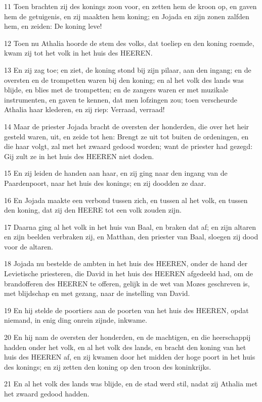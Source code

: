 \par 11 Toen brachten zij des konings zoon voor, en zetten hem de kroon op, en gaven hem de getuigenis, en zij maakten hem koning; en Jojada en zijn zonen zalfden hem, en zeiden: De koning leve!
\par 12 Toen nu Athalia hoorde de stem des volks, dat toeliep en den koning roemde, kwam zij tot het volk in het huis des HEEREN.
\par 13 En zij zag toe; en ziet, de koning stond bij zijn pilaar, aan den ingang; en de oversten en de trompetten waren bij den koning; en al het volk des lands was blijde, en blies met de trompetten; en de zangers waren er met muzikale instrumenten, en gaven te kennen, dat men lofzingen zou; toen verscheurde Athalia haar klederen, en zij riep: Verraad, verraad!
\par 14 Maar de priester Jojada bracht de oversten der honderden, die over het heir gesteld waren, uit, en zeide tot hen: Brengt ze uit tot buiten de ordeningen, en die haar volgt, zal met het zwaard gedood worden; want de priester had gezegd: Gij zult ze in het huis des HEEREN niet doden.
\par 15 En zij leiden de handen aan haar, en zij ging naar den ingang van de Paardenpoort, naar het huis des konings; en zij doodden ze daar.
\par 16 En Jojada maakte een verbond tussen zich, en tussen al het volk, en tussen den koning, dat zij den HEERE tot een volk zouden zijn.
\par 17 Daarna ging al het volk in het huis van Baal, en braken dat af; en zijn altaren en zijn beelden verbraken zij, en Matthan, den priester van Baal, sloegen zij dood voor de altaren.
\par 18 Jojada nu bestelde de ambten in het huis des HEEREN, onder de hand der Levietische priesteren, die David in het huis des HEEREN afgedeeld had, om de brandofferen des HEEREN te offeren, gelijk in de wet van Mozes geschreven is, met blijdschap en met gezang, naar de instelling van David.
\par 19 En hij stelde de poortiers aan de poorten van het huis des HEEREN, opdat niemand, in enig ding onrein zijnde, inkwame.
\par 20 En hij nam de oversten der honderden, en de machtigen, en die heerschappij hadden onder het volk, en al het volk des lands, en bracht den koning van het huis des HEEREN af, en zij kwamen door het midden der hoge poort in het huis des konings; en zij zetten den koning op den troon des koninkrijks.
\par 21 En al het volk des lands was blijde, en de stad werd stil, nadat zij Athalia met het zwaard gedood hadden.

